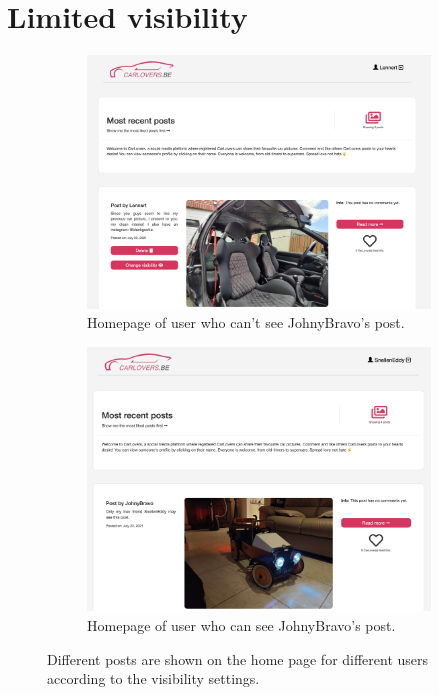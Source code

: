 \section*{Limited visibility}

\begin{figure}[H]
     \centering
     \begin{subfigure}[b]{0.9\textwidth}
         \centering
         \includegraphics[width=\textwidth]{images/home.png}
         \caption{Homepage of user who can't see JohnyBravo's post.}
         \label{fig:homenormal}
     \end{subfigure}
     \hfill
     \begin{subfigure}[b]{0.9\textwidth}
         \centering
         \includegraphics[width=\textwidth]{images/homesnellen.png}
         \caption{Homepage of user who can see JohnyBravo's post.}
         \label{fig:homesnellen}
     \end{subfigure}
        \caption{Different posts are shown on the home page for different users according to the visibility settings.}
        \label{fig:homedifferent}
\end{figure}